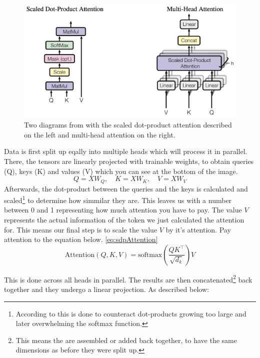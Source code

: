 \documentclass{article}
\begin{document}
\begin{figure}[htbp]
    \centering
    \includegraphics[width=0.5\paperwidth]{images/dotproduct_1.png}
    \caption{Two diagrams from \cite{vaswani2023attentionneed} with the scaled 
    dot-product attention described on the left and multi-head attention on the 
    right.}
    \label{fig:MHAttention}
\end{figure}

Data is first split up eqally into multiple heads which will process it in 
parallel. There, the tensors are linearly projected with trainable weights, 
to obtain queries (Q), keys (K) and values (V) which you can see at the bottom 
of the image.
$$
Q = X W_Q, \quad K = X W_K, \quad V = X W_V
$$
Afterwards, the dot-product between the queries and the keys is calculated and 
scaled\footnote{According to \cite{vaswani2023attentionneed} this is done to 
counteract dot-products growing too large and later overwhelming the softmax 
function.} to determine how simmilar they are. This leaves us with a 
number between 0 and 1 representing how much attention you have to pay. The 
value $V$ represents the actual information of the token we just calculated the 
attention for. This means our final step is to scale the value $V$ by it's 
attention. Pay attention to the equation below. \eqref{eq:sdpAttention}
\begin{equation}
    \text{Attention}(Q, K, V) = \text{softmax}\left( \frac{Q K^\top}{\sqrt{d_k}} \right) V \label{eq:sdpAttention}
\end{equation}

This is done across all heads in parallel. The results are then concatenated\footnote{
This means the are assembled or added back together, to have the same 
dimensions as before they were split up.} back together and they undergo 
a linear projection. As described below:
\end{document}
